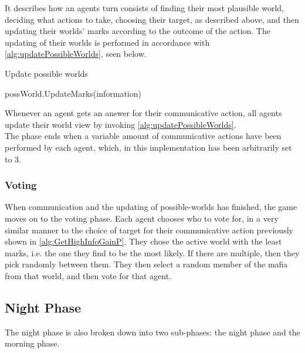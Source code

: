 \setcounter{algorithmcaption}{5}
It describes how an agents turn consists of finding their most plausible world,
deciding what actions to take, choosing their target, as described above, and
then updating their worlds' marks according to the outcome of the action.
The updating of their worlds is performed in accordance with
\cref{alg:updatePossibleWorlds}, seen below.
\begin{algorithm}[H]
	\caption{Update possible worlds}
	\begin{algorithmic}[1]
		\State possWorld.UpdateMarks(information)
		\EndFor
		\EndFor
		\EndFunction
	\end{algorithmic}\label{alg:updatePossibleWorlds}
\end{algorithm}
\setcounter{algorithmcaption}{6}
Whenever an agent gets an answer for their communicative action, all agents update their
world view by invoking \cref{alg:updatePossibleWorlds}.\\

The phase ends when a variable amount of communicative actions have been
performed by each agent, which, in this implementation has been arbitrarily set
to 3.

\subsubsection{Voting}\label{sec:voting}
When communication and the updating of possible-worlds has finished, the game
moves on to the voting phase. Each agent chooses who to vote for, in a very
similar manner to the choice of target for their communicative action
previously shown in \cref{alg:GetHighInfoGainP}. They chose the active world with the
least marks, i.e. the one they find to be the most likely. If there are
multiple, then they pick randomly between them. They then select a random
member of the mafia from that world, and then vote for that agent.

\subsection{Night Phase}\label{sec:nightPhase}
The night phase is also broken down into two sub-phases: the night phase and
the morning phase.

